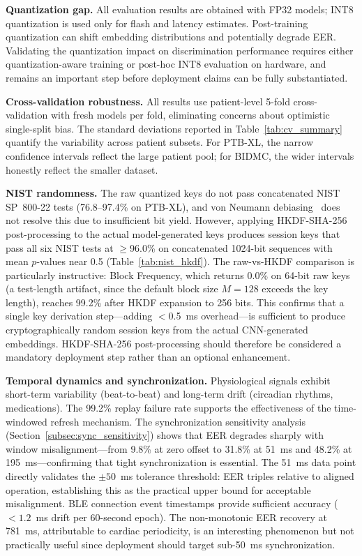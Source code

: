 \documentclass[sensors,article,submit,pdftex,moreauthors]{Definitions/mdpi}
\begin{document}
\textbf{Quantization gap.} All evaluation results are obtained with FP32 models; INT8 quantization is used only for flash and latency estimates. Post-training quantization can shift embedding distributions and potentially degrade EER. Validating the quantization impact on discrimination performance requires either quantization-aware training or post-hoc INT8 evaluation on hardware, and remains an important step before deployment claims can be fully substantiated.

\textbf{Cross-validation robustness.} All results use patient-level 5-fold cross-validation with fresh models per fold, eliminating concerns about optimistic single-split bias. The standard deviations reported in Table~\ref{tab:cv_summary} quantify the variability across patient subsets. For PTB-XL, the narrow confidence intervals reflect the large patient pool; for BIDMC, the wider intervals honestly reflect the smaller dataset.

\textbf{NIST randomness.} The raw quantized keys do not pass concatenated NIST SP~800-22 tests (76.8--97.4\% on PTB-XL), and von Neumann debiasing~\cite{von1951various} does not resolve this due to insufficient bit yield. However, applying HKDF-SHA-256 post-processing to the actual model-generated keys produces session keys that pass all six NIST tests at $\geq$96.0\% on concatenated 1024-bit sequences with mean $p$-values near 0.5 (Table~\ref{tab:nist_hkdf}). The raw-vs-HKDF comparison is particularly instructive: Block Frequency, which returns 0.0\% on 64-bit raw keys (a test-length artifact, since the default block size $M = 128$ exceeds the key length), reaches 99.2\% after HKDF expansion to 256 bits. This confirms that a single key derivation step---adding $<$0.5~ms overhead---is sufficient to produce cryptographically random session keys from the actual CNN-generated embeddings. HKDF-SHA-256 post-processing should therefore be considered a mandatory deployment step rather than an optional enhancement.

\textbf{Temporal dynamics and synchronization.} Physiological signals exhibit short-term variability (beat-to-beat) and long-term drift (circadian rhythms, medications). The 99.2\% replay failure rate supports the effectiveness of the time-windowed refresh mechanism. The synchronization sensitivity analysis (Section~\ref{subsec:sync_sensitivity}) shows that EER degrades sharply with window misalignment---from 9.8\% at zero offset to 31.8\% at 51~ms and 48.2\% at 195~ms---confirming that tight synchronization is essential. The 51~ms data point directly validates the $\pm 50$~ms tolerance threshold: EER triples relative to aligned operation, establishing this as the practical upper bound for acceptable misalignment. BLE connection event timestamps provide sufficient accuracy ($< 1.2$~ms drift per 60-second epoch). The non-monotonic EER recovery at 781~ms, attributable to cardiac periodicity, is an interesting phenomenon but not practically useful since deployment should target sub-50~ms synchronization.
\end{document}
